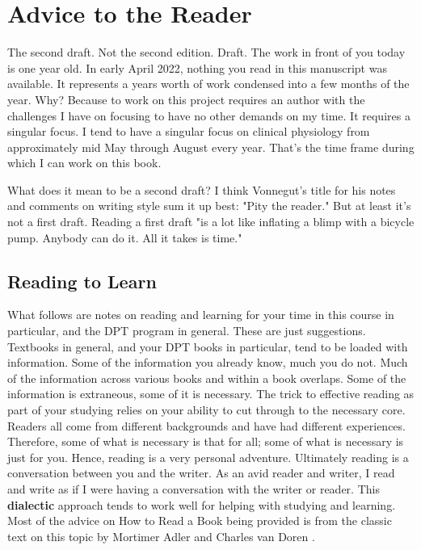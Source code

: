 \chapter*{Advice to the Reader}

The second draft. Not the second edition. Draft. The work in front of you today is one year old. In early April 2022, nothing you read in this manuscript was available. It represents a years worth of work condensed into a few months of the year. Why? Because to work on this project requires an author  with the challenges I have on focusing to have no other demands on my time. It requires a singular focus. I tend to have a singular focus on clinical physiology from approximately mid May through August every year. That's the time frame during which I can work on this book.

What does it mean to be a second draft? 
I think Vonnegut's title for his notes and comments on writing style sum it up best: "Pity the reader." \cite{vonnegut_pity_2019} But at least it's not a first draft. Reading a first draft "is a lot like inflating a blimp with a bicycle pump. Anybody can do it. All it takes is time." \cite{vonnegut_pity_2019}

\section{Reading to Learn}

What follows are notes on reading and learning for your time in this course in particular, and the DPT program in general. These are just suggestions. Textbooks in general, and your DPT books in particular, tend to be loaded with information. Some of the information you already know, much you do not. Much of the information across various books and within a book overlaps. Some of the information is extraneous, some of it is necessary.\footnotemark{} The trick to effective reading as part of your studying relies on your ability to cut through to the necessary core. Readers all come from different backgrounds and have had different experiences. Therefore, some of what is necessary is that for all; some of what is necessary is just for you. Hence, reading is a very personal adventure. Ultimately reading is a conversation between you and the writer. As an avid reader and writer, I read and write as if I were having a conversation with the writer or reader. This \textbf{dialectic} approach tends to work well for helping with studying and learning. Most of the advice on How to Read a Book being provided is from the classic text on this topic by Mortimer Adler and Charles van Doren \cite{adler_how_1942}.

